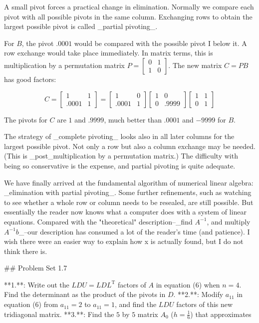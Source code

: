 A small pivot forces a practical change in elimination. Normally we compare each pivot with all possible pivots in the same column. Exchanging rows to obtain the largest possible pivot is called _partial pivoting_.

For \(B\), the pivot \(.0001\) would be compared with the possible pivot I below it. A row exchange would take place immediately. In matrix terms, this is multiplication by a permutation matrix \(P=[\begin{smallmatrix}0&1\\ 1&0\end{smallmatrix}]\). The new matrix \(C=PB\) has good factors:

\[C=\begin{bmatrix}1&1\\ .0001&1\end{bmatrix}=\begin{bmatrix}1&0\\ .0001&1\end{bmatrix}\begin{bmatrix}1&0\\ 0&.9999\end{bmatrix}\begin{bmatrix}1&1\\ 0&1\end{bmatrix}\]

The pivots for \(C\) are \(1\) and \(.9999\), much better than \(.0001\) and \(-9999\) for \(B\).

The strategy of _complete pivoting_ looks also in all later columns for the largest possible pivot. Not only a row but also a column exchange may be needed. (This is _post_multiplication by a permutation matrix.) The difficulty with being so conservative is the expense, and partial pivoting is quite adequate.

We have finally arrived at the fundamental algorithm of numerical linear algebra: _elimination with partial pivoting_. Some further refinements, such as watching to see whether a whole row or column needs to be resealed, are still possible. But essentially the reader now knows what a computer does with a system of linear equations. Compared with the "theoretical" description--_find \(A^{-1}\), and multiply \(A^{-1}b\)_--our description has consumed a lot of the reader's time (and patience). I wish there were an easier way to explain how x is actually found, but I do not think there is.

## Problem Set 1.7

**1.**: Write out the \(LDU=LDL^{\mathrm{T}}\) factors of \(A\) in equation (6) when \(n=4\). Find the determinant as the product of the pivots in \(D\).
**2.**: Modify \(a_{11}\) in equation (6) from \(a_{11}=2\) to \(a_{11}=1\), and find the \(LDU\) factors of this new tridiagonal matrix.
**3.**: Find the \(5\) by \(5\) matrix \(A_{0}\) (\(h=\frac{1}{6}\)) that approximates

